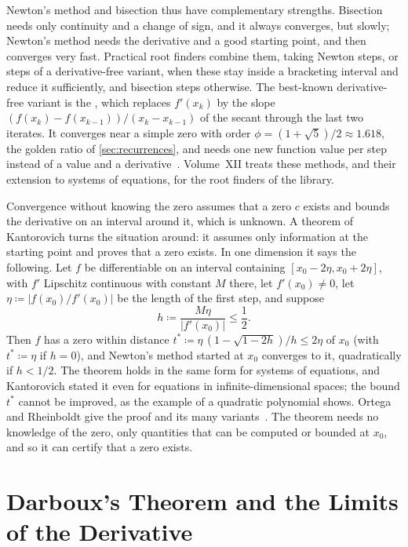 Newton's method and bisection thus have complementary strengths. Bisection needs only continuity and a change of sign, and it always converges, but slowly; Newton's method needs the derivative and a good starting point, and then converges very fast. Practical root finders combine them, taking Newton steps, or steps of a derivative-free variant, when these stay inside a bracketing interval and reduce it sufficiently, and bisection steps otherwise. The best-known derivative-free variant is the , which replaces $f'(x_k)$ by the slope $(f(x_k)-f(x_{k-1}))/(x_k-x_{k-1})$ of the secant through the last two iterates. It converges near a simple zero with order $\phi=(1+\sqrt5)/2\approx1.618$, the golden ratio of \cref{sec:recurrences}, and needs one new function value per step instead of a value and a derivative~\cite{suli2003}. Volume~XII treats these methods, and their extension to systems of equations, for the root finders of the library.

\begin{note}{Convergence without knowing the zero}
 assumes that a zero $c$ exists and bounds the derivative on an interval around it, which is unknown. A theorem of Kantorovich turns the situation around: it assumes only information at the starting point and proves that a zero exists. In one dimension it says the following. Let $f$ be differentiable on an interval containing $[x_0-2\eta,x_0+2\eta]$, with $f'$ Lipschitz continuous with constant $M$ there, let $f'(x_0)\ne0$, let $\eta\coloneqq|f(x_0)/f'(x_0)|$ be the length of the first step, and suppose
\[
h\coloneqq\frac{M\eta}{|f'(x_0)|}\le\frac12 .
\]
Then $f$ has a zero within distance $t^*\coloneqq\eta\,(1-\sqrt{1-2h})/h\le2\eta$ of $x_0$ (with $t^*\coloneqq\eta$ if $h=0$), and Newton's method started at $x_0$ converges to it, quadratically if $h<1/2$. The theorem holds in the same form for systems of equations, and Kantorovich stated it even for equations in infinite-dimensional spaces; the bound $t^*$ cannot be improved, as the example of a quadratic polynomial shows. Ortega and Rheinboldt give the proof and its many variants~\cite{ortega2000}. The theorem needs no knowledge of the zero, only quantities that can be computed or bounded at $x_0$, and so it can certify that a zero exists.
\end{note}

\section{Darboux's Theorem and the Limits of the Derivative}
\label{sec:darboux}

